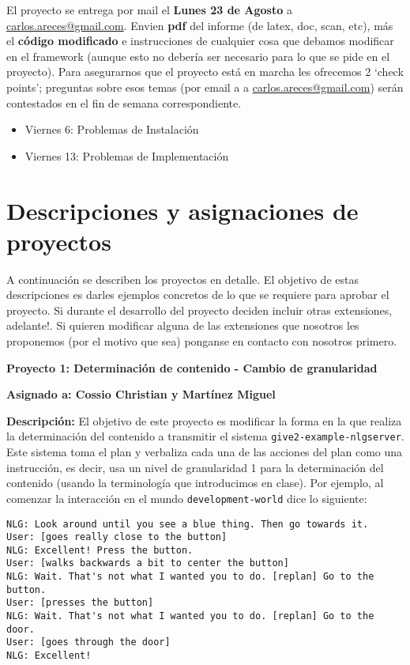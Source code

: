 \documentclass{article}
\begin{document}
El proyecto se entrega por mail el \textbf{Lunes 23 de Agosto} a \url{carlos.areces@gmail.com}. Envien 	\textbf{pdf} del informe (de latex, doc, scan, etc), m\'as el \textbf{c\'odigo modificado} e instrucciones de cualquier cosa que debamos modificar en el framework (aunque esto no deber\'ia ser necesario para lo que se pide en el proyecto). Para asegurarnos que el proyecto est\'a en marcha les ofrecemos 2 `check points'; preguntas sobre esos temas (por email a a \url{carlos.areces@gmail.com}) ser\'an contestados en el fin 
de semana correspondiente. 
\begin{itemize}
  \item Viernes 6: Problemas de Instalaci\'on
  \item Viernes 13: Problemas de Implementaci\'on
\end{itemize}





\section{Descripciones y asignaciones de proyectos} \label{porproyecto}

A continuaci\'on se describen los proyectos en detalle. El objetivo de estas descripciones es darles ejemplos concretos de lo que se requiere para aprobar el proyecto. Si durante el desarrollo del proyecto deciden incluir otras extensiones, adelante!. Si quieren modificar alguna de las extensiones que nosotros les proponemos (por el motivo que sea) ponganse en contacto con nosotros primero.   

\bigskip
\noindent
\textbf{Proyecto 1: Determinaci\'on de contenido - Cambio de granularidad} 

\textbf{Asignado a: Cossio Christian y Mart\'inez Miguel} 

\textbf{Descripci\'on:} El objetivo de este proyecto es modificar la forma en la que realiza la determinaci\'on del contenido a transmitir el sistema \texttt{give2-example-nlgserver}. Este sistema toma el plan y verbaliza cada una de las acciones del plan como una instrucci\'on, es decir, usa un nivel de granularidad 1 para la determinaci\'on del contenido (usando la terminolog\'ia que introducimos en clase). Por ejemplo, al comenzar la interacci\'on en el mundo \texttt{development-world} dice lo siguiente: 

\begin{verbatim}
NLG: Look around until you see a blue thing. Then go towards it.
User: [goes really close to the button]
NLG: Excellent! Press the button.
User: [walks backwards a bit to center the button]
NLG: Wait. That's not what I wanted you to do. [replan] Go to the
button.
User: [presses the button]
NLG: Wait. That's not what I wanted you to do. [replan] Go to the door.
User: [goes through the door]
NLG: Excellent!
\end{verbatim}
\end{document}
